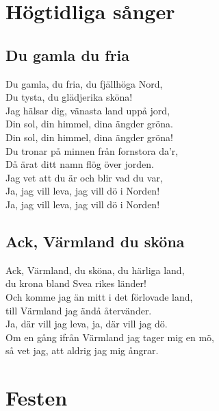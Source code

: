 \documentclass[twoside, openright]{report}
\begin{document}
\chapter{Högtidliga sånger}

\section{Du gamla du fria}
Du gamla, du fria, du fjällhöga Nord,\\
Du tysta, du glädjerika sköna!\\
Jag hälsar dig, vänasta land uppå jord,\\
Din sol, din himmel, dina ängder gröna.\\
Din sol, din himmel, dina ängder gröna!\\

Du tronar på minnen från fornstora da'r,\\
Då ärat ditt namn flög över jorden.\\
Jag vet att du är och blir vad du var,\\
Ja, jag vill leva, jag vill dö i Norden!\\
Ja, jag vill leva, jag vill dö i Norden!

\section{Ack, Värmland du sköna}
Ack, Värmland, du sköna, du härliga land,\\
du krona bland Svea rikes länder!\\
Och komme jag än mitt i det förlovade land,\\
till Värmland jag ändå återvänder.\\
Ja, där vill jag leva, ja, där vill jag dö.\\
Om en gång ifrån Värmland jag tager mig en mö,\\
så vet jag, att aldrig jag mig ångrar.

\chapter{Festen}
\end{document}

